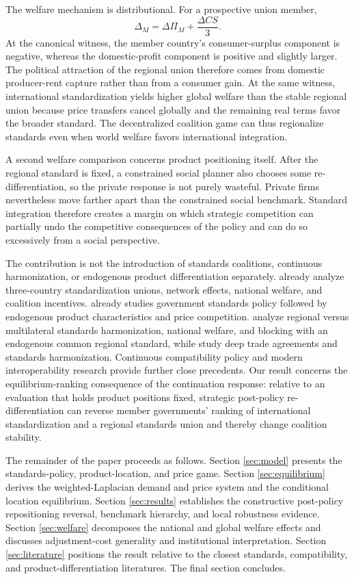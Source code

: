 The welfare mechanism is distributional. For a prospective union member,
\[
\Delta_M=\Delta\Pi_M+\frac{\Delta CS}{3}.
\]
At the canonical witness, the member country's consumer-surplus component is negative, whereas the domestic-profit component is positive and slightly larger. The political attraction of the regional union therefore comes from domestic producer-rent capture rather than from a consumer gain. At the same witness, international standardization yields higher global welfare than the stable regional union because price transfers cancel globally and the remaining real terms favor the broader standard. The decentralized coalition game can thus regionalize standards even when world welfare favors international integration.

A second welfare comparison concerns product positioning itself. After the regional standard is fixed, a constrained social planner also chooses some re-differentiation, so the private response is not purely wasteful. Private firms nevertheless move farther apart than the constrained social benchmark. Standard integration therefore creates a margin on which strategic competition can partially undo the competitive consequences of the policy and can do so excessively from a social perspective.

The contribution is not the introduction of standards coalitions, continuous harmonization, or endogenous product differentiation separately. \citet{GandalShy2001} already analyze three-country standardization unions, network effects, national welfare, and coalition incentives. \citet{Ruiz2004} already studies government standards policy followed by endogenous product characteristics and price competition. \citet{TakaradaEtAl2020} analyze regional versus multilateral standards harmonization, national welfare, and blocking with an endogenous common regional standard, while \citet{KawabataTakarada2021} study deep trade agreements and standards harmonization. Continuous compatibility policy and modern interoperability research provide further close precedents. Our result concerns the equilibrium-ranking consequence of the continuation response: relative to an evaluation that holds product positions fixed, strategic post-policy re-differentiation can reverse member governments' ranking of international standardization and a regional standards union and thereby change coalition stability.

The remainder of the paper proceeds as follows. Section \ref{sec:model} presents the standards-policy, product-location, and price game. Section \ref{sec:equilibrium} derives the weighted-Laplacian demand and price system and the conditional location equilibrium. Section \ref{sec:results} establishes the constructive post-policy repositioning reversal, benchmark hierarchy, and local robustness evidence. Section \ref{sec:welfare} decomposes the national and global welfare effects and discusses adjustment-cost generality and institutional interpretation. Section \ref{sec:literature} positions the result relative to the closest standards, compatibility, and product-differentiation literatures. The final section concludes.
